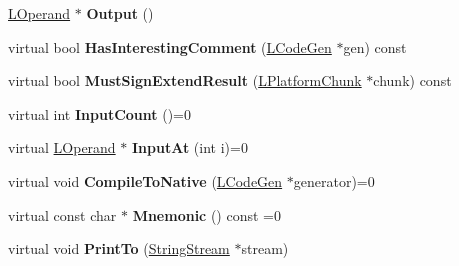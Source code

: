 \begin{DoxyCompactItemize}
\item 
\hyperlink{classv8_1_1internal_1_1_l_operand}{L\+Operand} $\ast$ {\bfseries Output} ()\hypertarget{classv8_1_1internal_1_1_l_instruction_ac4116b2faee2d8d3f0d7d21a27b40ad4}{}\label{classv8_1_1internal_1_1_l_instruction_ac4116b2faee2d8d3f0d7d21a27b40ad4}

\item 
virtual bool {\bfseries Has\+Interesting\+Comment} (\hyperlink{classv8_1_1internal_1_1_l_code_gen}{L\+Code\+Gen} $\ast$gen) const \hypertarget{classv8_1_1internal_1_1_l_instruction_affae35afdf10150a226c035d47b8ce27}{}\label{classv8_1_1internal_1_1_l_instruction_affae35afdf10150a226c035d47b8ce27}

\item 
virtual bool {\bfseries Must\+Sign\+Extend\+Result} (\hyperlink{classv8_1_1internal_1_1_l_platform_chunk}{L\+Platform\+Chunk} $\ast$chunk) const \hypertarget{classv8_1_1internal_1_1_l_instruction_adbdc78a90a3c7f73bc861e39d68e97a1}{}\label{classv8_1_1internal_1_1_l_instruction_adbdc78a90a3c7f73bc861e39d68e97a1}

\item 
virtual int {\bfseries Input\+Count} ()=0\hypertarget{classv8_1_1internal_1_1_l_instruction_a10b5af4413b64db11db6f4dc266b5e4f}{}\label{classv8_1_1internal_1_1_l_instruction_a10b5af4413b64db11db6f4dc266b5e4f}

\item 
virtual \hyperlink{classv8_1_1internal_1_1_l_operand}{L\+Operand} $\ast$ {\bfseries Input\+At} (int i)=0\hypertarget{classv8_1_1internal_1_1_l_instruction_a65f5b87101a6f411d73e5ba9aa13a675}{}\label{classv8_1_1internal_1_1_l_instruction_a65f5b87101a6f411d73e5ba9aa13a675}

\item 
virtual void {\bfseries Compile\+To\+Native} (\hyperlink{classv8_1_1internal_1_1_l_code_gen}{L\+Code\+Gen} $\ast$generator)=0\hypertarget{classv8_1_1internal_1_1_l_instruction_acab3d83fd0de1d783ce5e5e8651009dd}{}\label{classv8_1_1internal_1_1_l_instruction_acab3d83fd0de1d783ce5e5e8651009dd}

\item 
virtual const char $\ast$ {\bfseries Mnemonic} () const  =0\hypertarget{classv8_1_1internal_1_1_l_instruction_ae256d0dcc2d6017d8c49d382254dccee}{}\label{classv8_1_1internal_1_1_l_instruction_ae256d0dcc2d6017d8c49d382254dccee}

\item 
virtual void {\bfseries Print\+To} (\hyperlink{classv8_1_1internal_1_1_string_stream}{String\+Stream} $\ast$stream)\hypertarget{classv8_1_1internal_1_1_l_instruction_a7fd3ca39e41f221d7dd97c947219770c}{}\label{classv8_1_1internal_1_1_l_instruction_a7fd3ca39e41f221d7dd97c947219770c}


\end{DoxyCompactItemize}
